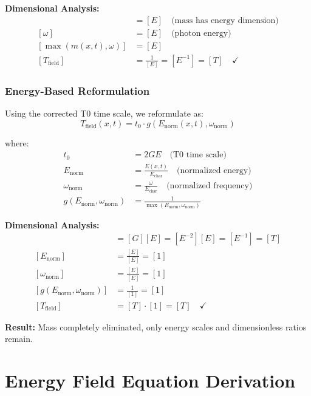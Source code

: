 \documentclass[12pt,a4paper]{report}
\newcommand{\tzero}{t_0}                  %
\begin{document}
	\textbf{Dimensional Analysis:}
	\begin{align}
		[m(x,t)] &= [E] \quad \text{(mass has energy dimension)} \\
		[\omega] &= [E] \quad \text{(photon energy)} \\
		[\max(m(x,t), \omega)] &= [E] \\
		[T_{\text{field}}] &= \frac{1}{[E]} = [E^{-1}] = [T] \quad \checkmark
	\end{align}
	
	\subsubsection{Energy-Based Reformulation}
	
	Using the corrected T0 time scale, we reformulate as:
	\begin{equation}
		\boxed{T_{\text{field}}(x,t) = \tzero \cdot g(E_{\text{norm}}(x,t), \omega_{\text{norm}})}
		\label{eq:time_field_energy_based}
	\end{equation}
	
	where:
	\begin{align}
		\tzero &= 2GE \quad \text{(T0 time scale)} \\
		E_{\text{norm}} &= \frac{E(x,t)}{E_{\text{char}}} \quad \text{(normalized energy)} \\
		\omega_{\text{norm}} &= \frac{\omega}{E_{\text{char}}} \quad \text{(normalized frequency)} \\
		g(E_{\text{norm}}, \omega_{\text{norm}}) &= \frac{1}{\max(E_{\text{norm}}, \omega_{\text{norm}})}
	\end{align}
	
	\textbf{Dimensional Analysis:}
	\begin{align}
		[\tzero] &= [G][E] = [E^{-2}][E] = [E^{-1}] = [T] \\
		[E_{\text{norm}}] &= \frac{[E]}{[E]} = [1] \\
		[\omega_{\text{norm}}] &= \frac{[E]}{[E]} = [1] \\
		[g(E_{\text{norm}}, \omega_{\text{norm}})] &= \frac{1}{[1]} = [1] \\
		[T_{\text{field}}] &= [T] \cdot [1] = [T] \quad \checkmark
	\end{align}
	
	\textbf{Result:} Mass completely eliminated, only energy scales and dimensionless ratios remain.
	
	\section{Energy Field Equation Derivation}\label{sec:energy_field_equation}
	
\end{document}
